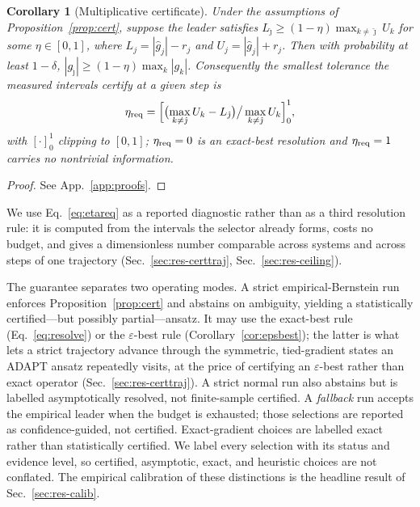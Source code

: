 \documentclass[aps,pra,reprint,superscriptaddress,nofootinbib,floatfix]{revtex4-2}
\newtheorem{corollary}{Corollary}
\begin{document}
\begin{corollary}[Multiplicative certificate]
\label{cor:multi}
Under the assumptions of Proposition~\ref{prop:cert}, suppose the leader satisfies $L_{\hat\jmath}\ge(1-\eta)\max_{k\neq\hat\jmath}U_k$ for some $\eta\in[0,1]$, where $L_j=|\widehat g_j|-r_j$ and $U_j=|\widehat g_j|+r_j$. Then with probability at least $1-\delta$, $|g_{\hat\jmath}|\ge(1-\eta)\max_k|g_k|$. Consequently the smallest tolerance the measured intervals certify at a given step is
\begin{equation}
\eta_{\rm req}=\Bigl[\bigl(\max_{k\neq\hat\jmath}U_k-L_{\hat\jmath}\bigr)\big/\max_{k\neq\hat\jmath}U_k\Bigr]_0^1 ,
\label{eq:etareq}
\end{equation}
with $[\cdot]_0^1$ clipping to $[0,1]$; $\eta_{\rm req}=0$ is an exact-best resolution and $\eta_{\rm req}=1$ carries no nontrivial information.
\end{corollary}
\begin{proof}
See App.~\ref{app:proofs}.
\end{proof}

We use Eq.~\eqref{eq:etareq} as a reported diagnostic rather than as a third resolution rule: it is computed from the intervals the selector already forms, costs no budget, and gives a dimensionless number comparable across systems and across steps of one trajectory (Sec.~\ref{sec:res-certtraj}, Sec.~\ref{sec:res-ceiling}).

The guarantee separates two operating modes. A strict empirical-Bernstein run enforces Proposition~\ref{prop:cert} and abstains on ambiguity, yielding a statistically certified---but possibly partial---ansatz. It may use the exact-best rule (Eq.~\eqref{eq:resolve}) or the $\varepsilon$-best rule (Corollary~\ref{cor:epsbest}); the latter is what lets a strict trajectory advance through the symmetric, tied-gradient states an ADAPT ansatz repeatedly visits, at the price of certifying an $\varepsilon$-best rather than exact operator (Sec.~\ref{sec:res-certtraj}). A strict normal run also abstains but is labelled asymptotically resolved, not finite-sample certified. A \emph{fallback} run accepts the empirical leader when the budget is exhausted; those selections are reported as confidence-guided, not certified. Exact-gradient choices are labelled exact rather than statistically certified. We label every selection with its status and evidence level, so certified, asymptotic, exact, and heuristic choices are not conflated. The empirical calibration of these distinctions is the headline result of Sec.~\ref{sec:res-calib}.
\end{document}
